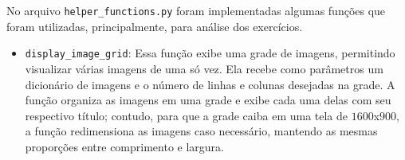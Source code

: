 No arquivo \texttt{helper\_functions.py} foram implementadas algumas funções que foram utilizadas, principalmente, para análise dos exercícios.

\begin{itemize}
    \item \texttt{display\_image\_grid}: Essa função exibe uma grade de imagens, permitindo visualizar várias imagens de uma só vez. Ela recebe como parâmetros um dicionário de imagens e o número de linhas e colunas desejadas na grade. A função organiza as imagens em uma grade e exibe cada uma delas com seu respectivo título; contudo, para que a grade caiba em uma tela de $1600$x$900$, a função redimensiona as imagens caso necessário, mantendo as mesmas proporções entre comprimento e largura.
\end{itemize}
